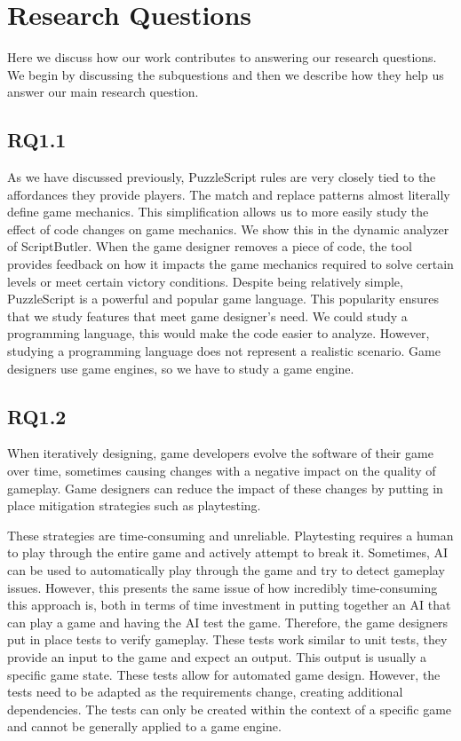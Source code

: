 \section{Research Questions}
Here we discuss how our work contributes to answering our research questions. We begin by discussing the subquestions and then we describe how they help us answer our main research question.

\subsection{RQ1.1} 
As we have discussed previously, PuzzleScript rules are very closely tied to the affordances they provide players. The match and replace patterns almost literally define game mechanics. This simplification allows us to more easily study the effect of code changes on game mechanics. We show this in the dynamic analyzer of ScriptButler. When the game designer removes a piece of code, the tool provides feedback on how it impacts the game mechanics required to solve certain levels or meet certain victory conditions. Despite being relatively simple, PuzzleScript is a powerful and popular game language. This popularity ensures that we study features that meet game designer's need. We could study a programming language, this would make the code easier to analyze. However, studying a programming language does not represent a realistic scenario. Game designers use game engines, so we have to study a game engine.

\subsection{RQ1.2} 
When iteratively designing, game developers evolve the software of their game over time, sometimes causing changes with a negative impact on the quality of gameplay. Game designers can reduce the impact of these changes by putting in place mitigation strategies such as playtesting. 

These strategies are time-consuming and unreliable. Playtesting requires a human to play through the entire game and actively attempt to break it. Sometimes, AI can be used to automatically play through the game and try to detect gameplay issues. However, this presents the same issue of how incredibly time-consuming this approach is, both in terms of time investment in putting together an AI that can play a game and having the AI test the game. Therefore, the game designers put in place tests to verify gameplay. These tests work similar to unit tests, they provide an input to the game and expect an output. This output is usually a specific game state. These tests allow for automated game design. However, the tests need to be adapted as the requirements change, creating additional dependencies. The tests can only be created within the context of a specific game and cannot be generally applied to a game engine.

